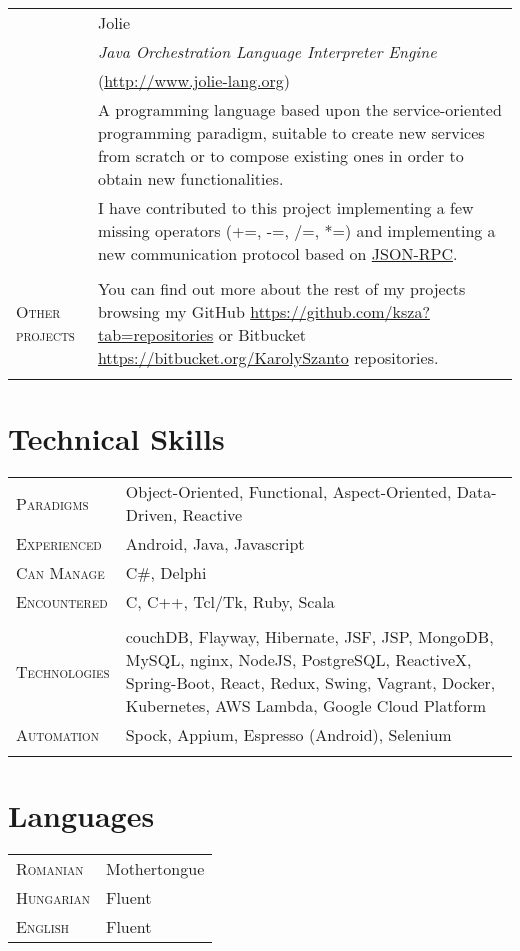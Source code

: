 \documentclass[a4paper,10pt]{article}
\begin{document}
\begin{longtable}{p{2.5cm}|p{11cm}}
 & Jolie\\
 & \emph{Java Orchestration Language Interpreter Engine}\\
 & \footnotesize{(\url{http://www.jolie-lang.org})}\\
 & \footnotesize{A programming language based upon the service-oriented programming paradigm, suitable to create new services from scratch or to compose existing ones in order to obtain new functionalities.}\\

& \footnotesize{I have contributed to this project implementing a
 few missing operators (+=, -=, /=, *=) and implementing a new communication protocol based on \href{http://json-rpc.org/}{JSON-RPC}.}\\ \multicolumn{2}{c}{} \\

 \raggedleft \textsc{Other projects} & You can find out more about the rest of my projects browsing my GitHub \url{https://github.com/ksza?tab=repositories} or Bitbucket \url{https://bitbucket.org/KarolySzanto} repositories.\\ 
 \multicolumn{2}{c}{} \\
\end{longtable}

\section{Technical Skills}
\begin{tabular}{p{2.5cm}p{11cm}}
\textsc{Paradigms} & Object-Oriented, Functional, Aspect-Oriented, Data-Driven, Reactive\\ 
\textsc{Experienced} & Android, Java, Javascript\\
\textsc{Can Manage} & C\#, Delphi\\
\textsc{Encountered} & C, C++, Tcl/Tk, Ruby, Scala\\
\multicolumn{2}{c}{} \\ 
\textsc{Technologies} & couchDB, Flayway, Hibernate, JSF,  JSP,  MongoDB, MySQL, nginx, NodeJS, PostgreSQL, ReactiveX, Spring-Boot, React, Redux, Swing, Vagrant, Docker, Kubernetes, AWS Lambda, Google Cloud Platform\\
\textsc{Automation} & Spock, Appium, Espresso (Android), Selenium\\
 \multicolumn{2}{c}{}\\
\end{tabular}

\section{Languages}
\begin{tabular}{p{2.5cm}p{11cm}}
\textsc{Romanian}& Mothertongue\\
\textsc{Hungarian}& Fluent\\
\textsc{English}& Fluent\\
\end{tabular}
\end{document}
